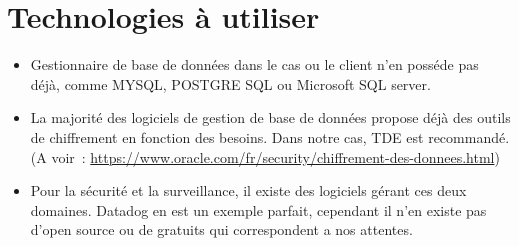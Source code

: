 \documentclass{article}
\begin{document}
\section{Technologies à utiliser}

\begin{itemize}
    \item Gestionnaire de base de données dans le cas ou le client n’en posséde pas déjà, comme MYSQL, POSTGRE SQL ou Microsoft SQL server.

    \item La majorité des logiciels de gestion de base de données propose déjà des outils de chiffrement en fonction des besoins. Dans notre cas, TDE est recommandé. (A voir : \url{https://www.oracle.com/fr/security/chiffrement-des-donnees.html})

    \item Pour la sécurité et la surveillance, il existe des logiciels gérant ces deux domaines. Datadog en est un exemple parfait, cependant il n’en existe pas d’open source ou de gratuits qui correspondent a nos attentes.
\end{itemize}
\end{document}
